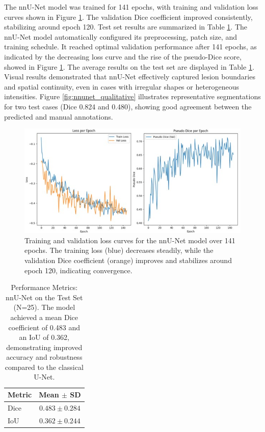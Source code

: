 \documentclass[12pt]{article}
\begin{document}
The nnU-Net model was trained for 141 epochs, with training and validation loss curves shown in Figure \ref{fig:nnu-net_loss_curve}. The validation Dice coefficient improved consistently, stabilizing around epoch 120. Test set results are summarized in Table \ref{tab:nnunet_metrics}.
%
The nnU-Net model automatically configured its preprocessing, patch size, and training schedule. It reached optimal validation performance after 141 epochs, as indicated by the decreasing loss curve and the rise of the pseudo-Dice score, showed in Figure \ref{fig:nnu-net_loss_curve}. The average results on the test set are displayed in Table \ref{tab:nnunet_metrics}.
%
Visual results demonstrated that nnU-Net effectively captured lesion boundaries and spatial continuity, even in cases with irregular shapes or heterogeneous intensities. Figure \ref{fig:nnunet_qualitative} illustrates representative segmentations for two test cases (Dice 0.824 and 0.480), showing good agreement between the predicted and manual annotations.

\begin{figure}[tp]
    \centering
    \includegraphics[width=\textwidth]{figures/Figure 3.jpg}
    \caption{Training and validation loss curves for the nnU-Net model over 141 epochs. The training loss (blue) decreases steadily, while the validation Dice coefficient (orange) improves and stabilizes around epoch 120, indicating convergence.}\label{fig:nnu-net_loss_curve}
\end{figure}

\begin{table}[tp]
  \centering
  \begin{tabular}{lc}
  \toprule
  Metric & Mean $\pm$ SD \\
  \midrule
  Dice & $0.483 \pm 0.284$ \\
  IoU & $0.362 \pm 0.244$ \\
\bottomrule
\end{tabular}
\caption{Performance Metrics: nnU-Net on the Test Set (N=25). The model achieved a mean Dice coefficient of 0.483 and an IoU of 0.362, demonstrating improved accuracy and robustness compared to the classical U-Net.}\label{tab:nnunet_metrics}
\end{table}
\end{document}
